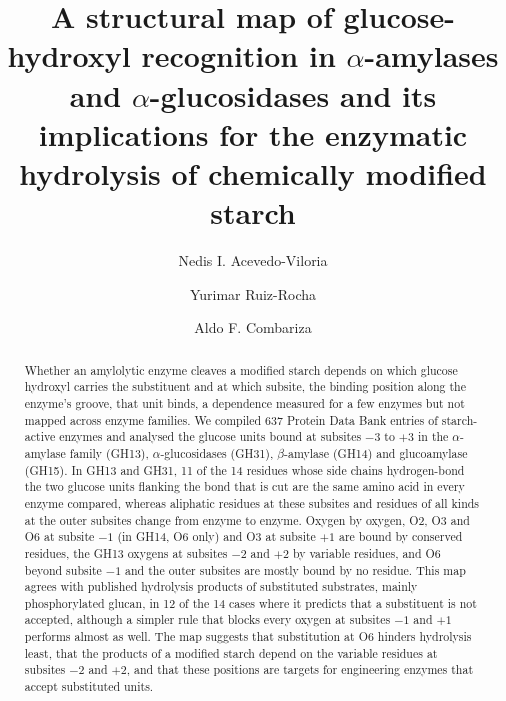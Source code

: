 \documentclass[preprint,12pt]{elsarticle}
\begin{document}
\begin{frontmatter}

\title{A structural map of glucose-hydroxyl recognition in $\alpha$-amylases and $\alpha$-glucosidases and its implications for the enzymatic hydrolysis of chemically modified starch}

\author[a,b]{Nedis I. Acevedo-Viloria}
\author[c,d]{Yurimar Ruiz-Rocha}
\author[e,d]{Aldo F. Combariza}

\begin{abstract}
Whether an amylolytic enzyme cleaves a modified starch depends on which glucose hydroxyl carries the substituent and at which subsite, the binding position along the enzyme's groove, that unit binds, a dependence measured for a few enzymes but not mapped across enzyme families. We compiled 637 Protein Data Bank entries of starch-active enzymes and analysed the glucose
units bound at subsites $-3$ to $+3$ in the $\alpha$-amylase family (GH13), $\alpha$-glucosidases (GH31),
$\beta$-amylase (GH14) and glucoamylase (GH15). In GH13 and GH31, 11 of the 14 residues whose side chains hydrogen-bond the two glucose
units flanking the bond that is cut are the same amino acid in every enzyme compared, whereas aliphatic
residues at these subsites and residues of all kinds at the outer subsites change from enzyme to enzyme. Oxygen by oxygen, O2, O3 and
O6 at subsite $-1$ (in GH14, O6 only) and O3 at subsite $+1$ are bound by conserved residues, the GH13 oxygens at
subsites $-2$ and $+2$ by variable residues, and O6 beyond subsite $-1$ and the outer subsites are mostly bound by no residue. This
map agrees with published hydrolysis products of substituted substrates, mainly phosphorylated glucan, in 12 of the
14 cases where it predicts that a substituent is not accepted, although a simpler rule that blocks every oxygen at
subsites $-1$ and $+1$ performs almost as well. The map suggests that substitution at O6 hinders hydrolysis least,
that the products of a modified starch depend on the variable residues at subsites $-2$ and $+2$, and that these
positions are targets for engineering enzymes that accept substituted units.
\end{abstract}


\end{frontmatter}
\end{document}
